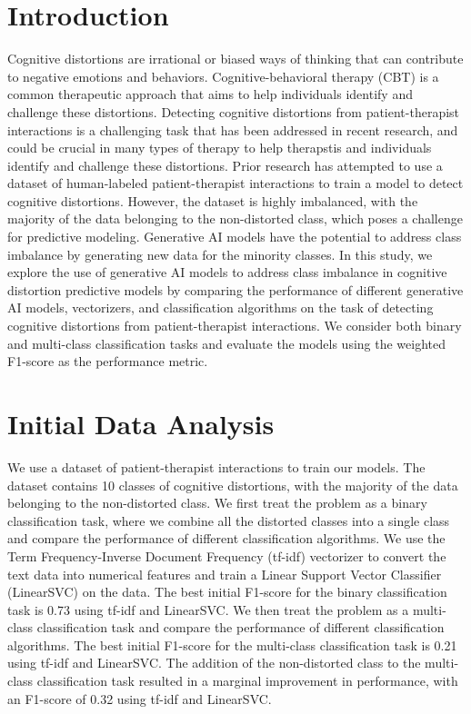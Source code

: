 \documentclass[a0,landscape]{a0poster}
\begin{document}
\begin{multicols}{4}
\color{Teal}

\section*{Introduction}
\color{Black}

Cognitive distortions are irrational or biased ways of thinking that can contribute to negative emotions and behaviors. 
Cognitive-behavioral therapy (CBT) is a common therapeutic approach that aims to help individuals identify and challenge these distortions.
Detecting cognitive distortions from patient-therapist interactions is a challenging task that has been addressed in recent research, and could be crucial in many types of 
therapy to help therapstis and individuals identify and challenge these distortions.
Prior research has attempted to use a dataset of human-labeled patient-therapist interactions to train a model to detect cognitive distortions\cite{original_paper}.
However, the dataset is highly imbalanced, with the majority of the data belonging to the non-distorted class, which poses a challenge for predictive modeling.
Generative AI models have the potential to address class imbalance by generating new data for the minority classes.
In this study, we explore the use of generative AI models to address class imbalance in cognitive distortion predictive models
by comparing the performance of different generative AI models, vectorizers, and classification algorithms on the task of detecting cognitive distortions from patient-therapist interactions.
We consider both binary and multi-class classification tasks and evaluate the models using the weighted F1-score as the performance metric.

\color{Teal}
\section*{Initial Data Analysis}
\color{Black}

We use a dataset of patient-therapist interactions to train our models.
The dataset contains 10 classes of cognitive distortions, with the majority of the data belonging to the non-distorted class.
We first treat the problem as a binary classification task, where we combine all the distorted classes into a single class and compare the performance of 
different classification algorithms.
We use the Term Frequency-Inverse Document Frequency (tf-idf) vectorizer to convert the text data into numerical features and train a 
Linear Support Vector Classifier (LinearSVC) on the data.
The best initial F1-score for the binary classification task is 0.73 using tf-idf and LinearSVC.
We then treat the problem as a multi-class classification task and compare the performance of different classification algorithms.
The best initial F1-score for the multi-class classification task is 0.21 using tf-idf and LinearSVC.
The addition of the non-distorted class to the multi-class classification task resulted in a marginal improvement in performance, 
with an F1-score of 0.32 using tf-idf and LinearSVC.



\end{multicols}
\end{document}
